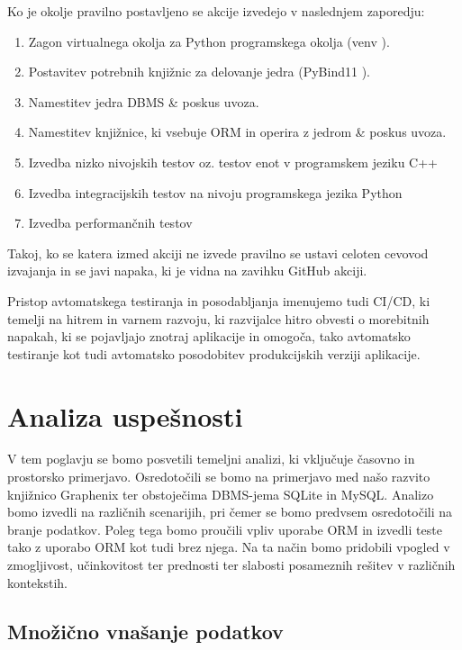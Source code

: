 \documentclass[a4paper,12pt,openright]{book}
\begin{document}
   Ko je okolje pravilno postavljeno se akcije izvedejo v naslednjem zaporedju:
   \begin{enumerate}
       \item Zagon virtualnega okolja za Python programskega okolja (venv \cite{PY_VENV_DOCS}).
       \item Postavitev potrebnih knjižnic za delovanje jedra (PyBind11 \cite{PYBIND11_GITHUB}).
       \item Namestitev jedra DBMS \& poskus uvoza.
       \item Namestitev knjižnice, ki vsebuje ORM in operira z jedrom \& poskus uvoza.
       \item Izvedba nizko nivojskih testov oz. testov enot v programskem jeziku C++
       \item Izvedba integracijskih testov na nivoju programskega jezika Python
       \item Izvedba performančnih testov
   \end{enumerate}

    \noindent
   Takoj, ko se katera izmed akciji ne izvede pravilno se ustavi celoten cevovod izvajanja in se javi napaka, ki je vidna na zavihku GitHub akciji.

   Pristop avtomatskega testiranja in posodabljanja imenujemo tudi CI/CD, ki temelji na hitrem in varnem razvoju, ki razvijalce hitro obvesti o morebitnih napakah, ki se pojavljajo znotraj aplikacije in omogoča, tako avtomatsko testiranje kot tudi avtomatsko posodobitev produkcijskih verziji aplikacije.
    
\chapter{Analiza uspešnosti}
\label{ch2}

    V tem poglavju se bomo posvetili temeljni analizi, ki vključuje časovno in prostorsko primerjavo. Osredotočili se bomo na primerjavo med našo razvito knjižnico Graphenix ter obstoječima DBMS-jema SQLite in MySQL. Analizo bomo izvedli na različnih scenarijih, pri čemer se bomo predvsem osredotočili na branje podatkov. Poleg tega bomo proučili vpliv uporabe ORM in izvedli teste tako z uporabo ORM kot tudi brez njega. Na ta način bomo pridobili vpogled v zmogljivost, učinkovitost ter prednosti ter slabosti posameznih rešitev v različnih kontekstih.

    \newpage
   \section{Množično vnašanje podatkov}
\end{document}
